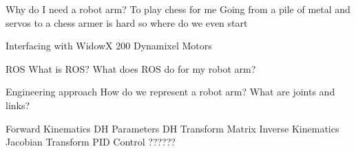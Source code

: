 Why do I need a robot arm?
    To play chess for me
Going from a pile of metal and servos to a chess armer
is hard so where do we even start


Interfacing with WidowX 200
    Dynamixel Motors

ROS
    What is ROS?
    What does ROS do for my robot arm?


Engineering approach
    How do we represent a robot arm?
    What are joints and links?


    Forward Kinematics
        DH Parameters
        DH Transform Matrix
    Inverse Kinematics
        Jacobian Transform
    PID Control
        ??????
